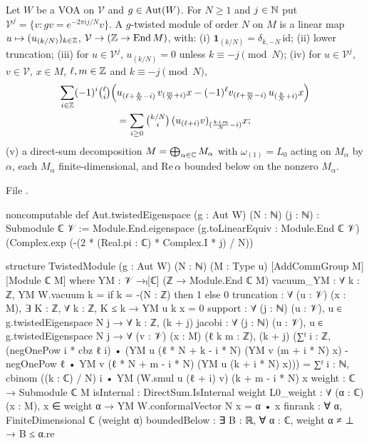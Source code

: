 \begin{definition}\label{ch07:def:twmod}
Let $W$ be a VOA on $\mathcal V$ and $g\in\operatorname{Aut}(W)$. For $N\ge1$ and $j\in{\mathbb{N}}$ put
$\mathcal V^j = \{v : g v = e^{-2\pi i j/N}v\}$. A $g$-twisted module of order $N$ on $M$ is a
linear map $u\mapsto (u_{(k/N)})_{k\in{\mathbb{Z}}}$, $\mathcal V\to ({\mathbb{Z}}\to\operatorname{End} M)$, with: (i)
$\mathbf 1_{(k/N)} = \delta_{k,-N}\,\mathrm{id}$; (ii) lower truncation; (iii) for $u\in\mathcal
V^j$, $u_{(k/N)} = 0$ unless $k\equiv -j \pmod N$; (iv) for $u\in\mathcal V^j$, $v\in\mathcal
V$, $x\in M$, $\ell, m\in {\mathbb{Z}}$ and $k\equiv -j \pmod N$,
\begin{multline}\label{ch07:eq:twjacobi}
  \sum_{i\in{\mathbb{Z}}}(-1)^i\tbinom{\ell}{i}\Bigl(u_{(\ell+\frac kN-i)}\,v_{(\frac mN+i)}x - (-1)^\ell
  v_{(\ell+\frac mN-i)}\,u_{(\frac kN+i)}x\Bigr)\\
  = \sum_{i\ge 0}\tbinom{k/N}{i}\,(u_{(\ell+i)}v)_{(\frac{k+m}{N}-i)}x;
\end{multline}
(v) a direct-sum decomposition $M = \bigoplus_{\alpha\in{\mathbb{C}}}M_\alpha$ with $\omega_{(1)} = L_0$
acting on $M_\alpha$ by $\alpha$, each $M_\alpha$ finite-dimensional, and $\mathrm{Re}\,\alpha$
bounded below on the nonzero $M_\alpha$.
\end{definition}

\noindent File .
\begin{leancode}
noncomputable def Aut.twistedEigenspace (g : Aut W) (N : ℕ) (j : ℕ) : Submodule ℂ 𝒱 :=
  Module.End.eigenspace (g.toLinearEquiv : Module.End ℂ 𝒱)
    (Complex.exp (-(2 * (Real.pi : ℂ) * Complex.I * j) / N))

structure TwistedModule (g : Aut W) (N : ℕ) (M : Type u) [AddCommGroup M] [Module ℂ M] where
  YM : 𝒱 →ₗ[ℂ] (ℤ → Module.End ℂ M)
  vacuum_YM : ∀ k : ℤ, YM W.vacuum k = if k = -(N : ℤ) then 1 else 0
  truncation : ∀ (u : 𝒱) (x : M), ∃ K : ℤ, ∀ k : ℤ, K ≤ k → YM u k x = 0
  support : ∀ (j : ℕ) (u : 𝒱), u ∈ g.twistedEigenspace N j →
    ∀ k : ℤ, (k + j) %
  jacobi : ∀ (j : ℕ) (u : 𝒱), u ∈ g.twistedEigenspace N j → ∀ (v : 𝒱) (x : M) (ℓ k m : ℤ),
    (k + j) %
    (∑ᶠ i : ℤ, (negOnePow i * cbz ℓ i) •
        (YM u (ℓ * N + k - i * N) (YM v (m + i * N) x)
          - negOnePow ℓ • YM v (ℓ * N + m - i * N) (YM u (k + i * N) x)))
      = ∑ᶠ i : ℕ, cbinom ((k : ℂ) / N) i • YM (W.smul u (ℓ + i) v) (k + m - i * N) x
  weight : ℂ → Submodule ℂ M
  isInternal : DirectSum.IsInternal weight
  L0_weight : ∀ (α : ℂ) (x : M), x ∈ weight α → YM W.conformalVector N x = α • x
  finrank : ∀ α, FiniteDimensional ℂ (weight α)
  boundedBelow : ∃ B : ℝ, ∀ α : ℂ, weight α ≠ ⊥ → B ≤ α.re
\end{leancode}

